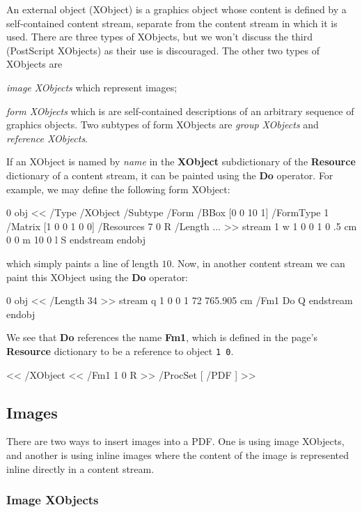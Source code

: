 An external object (XObject) is a graphics object whose content is defined by a self-contained content stream,
separate from the content stream in which it is used.
There are three types of XObjects, but we won't discuss the third (PostScript XObjects) as their use is
discouraged.
The other two types of XObjects are
\benum
    \item {\it image XObjects} which represent images;
    \item {\it form XObjects} which is are self-contained descriptions of an arbitrary sequence of
    graphics objects.
    Two subtypes of form XObjects are {\it group XObjects} and {\it reference XObjects}.
\eenum

If an XObject is named by {\it name} in the {\bf XObject} subdictionary of the {\bf Resource} dictionary of
a content stream, it can be painted using the {\bf Do} operator.
For example, we may define the following form XObject:

 0 obj
<<
    /Type /XObject
    /Subtype /Form
    /BBox [0 0 10 1]
    /FormType 1
    /Matrix [1 0 0 1 0 0]
    /Resources 7 0 R
    /Length ...
>>
stream
1 w
1 0 0 1 0 .5 cm
0 0 m 10 0 l S
endstream
endobj
\elisting

\noindent which simply paints a line of length $10$.
Now, in another content stream we can paint this XObject using the {\bf Do} operator:

 0 obj
<<
    /Length 34        
>>
stream
q
1 0 0 1 72 765.905 cm
/Fm1 Do
Q
endstream
endobj
\elisting

\noindent We see that {\bf Do} references the name {\bf Fm1}, which is defined in the page's {\bf Resource}
dictionary to be a reference to object {\tt1 0}.

\blisting
<<
    /XObject << /Fm1 1 0 R >>
    /ProcSet [ /PDF ]
>>
\elisting

\subsection{Images}

There are two ways to insert images into a PDF.
One is using image XObjects, and another is using inline images where the content of the image is represented
inline directly in a content stream.

\subsubsection{Image XObjects}

